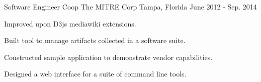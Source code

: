 \begin{cventries}
  \cventry
    {Software Engineer Coop} %
    {The MITRE Corp} %
    {Tampa, Florida} %
    {June 2012 - Sep. 2014} %
    {
      \begin{cvitems} %
        \item {Improved upon D3js mediawiki extensions.}
        \item {Built tool to manage artifacts collected in a software suite.}
        \item {Constructed sample application to demonstrate vendor capabilities.}
        \item {Designed a web interface for a suite of command line tools.}
      \end{cvitems}
    }

\end{cventries}
